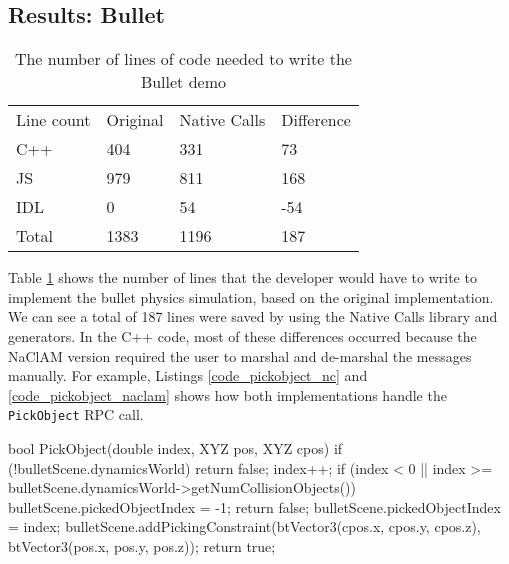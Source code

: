 \subsection{Results: Bullet} %
\label{sub:evaluation_usability_bullet}
\begin{table}[h]
\centering
\begin{tabular}{llll}
Line count                 & Original & Native Calls & Difference \\ \cline{2-4} 
\multicolumn{1}{l|}{C++}   & 404      & 331          &  73        \\
\multicolumn{1}{l|}{JS}    & 979      & 811          &  168       \\
\multicolumn{1}{l|}{IDL}   & 0        & 54           &  -54       \\
\multicolumn{1}{l|}{Total} & 1383     & 1196         &  187
\end{tabular}
\caption{The number of lines of code needed to write the Bullet demo}
\label{table:eval_usability_results_bullet}
\end{table}

Table \ref{table:eval_usability_results_bullet} shows the number of lines that the developer would have to write to implement the bullet physics simulation, based on the original implementation. We can see a total of 187 lines were saved by using the Native Calls library and generators. In the C++ code, most of these differences occurred because the NaClAM version required the user to marshal and de-marshal the messages manually. For example, Listings \ref{code_pickobject_nc} and \ref{code_pickobject_naclam} shows how both implementations handle the \lstinline{PickObject} RPC call.

\begin{code}
bool PickObject(double index, XYZ pos, XYZ cpos) {
  if (!bulletScene.dynamicsWorld) {
    return false;
  }
  index++;
  if (index < 0 || 
       index >= bulletScene.dynamicsWorld->getNumCollisionObjects()) {
    bulletScene.pickedObjectIndex = -1;
    return false;
  }
  bulletScene.pickedObjectIndex = index;
  bulletScene.addPickingConstraint(btVector3(cpos.x, cpos.y, cpos.z), 
                                      btVector3(pos.x, pos.y, pos.z));
  return true;
}
\end{code}


